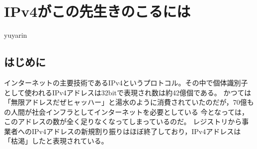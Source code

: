 

\chapter{IPv4がこの先生きのこるには}

\begin{flushright}
 yuyarin %
\end{flushright}

\section{はじめに}

\lettrine{イ}
ンターネットの主要技術であるIPv4というプロトコル。その中で個体識別子として使われるIPv4アドレスは32bitで表現され数は約42億個である。
かつては「無限アドレスだぜヒャッハー」と湯水のように消費されていたのだが，70億もの人間が社会インフラとしてインターネットを必要としている
今となっては，このアドレスの数が全く足りなくなってしまっているのだ。
レジストリから事業者へのIPv4アドレスの新規割り振りはほぼ終了しており，IPv4アドレスは「枯渇」したと表現されている。
